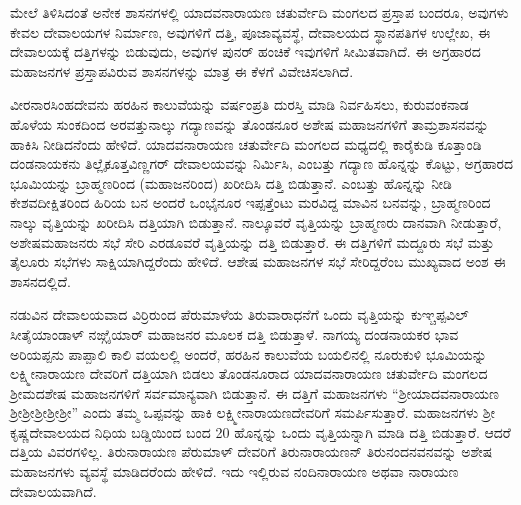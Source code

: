 ಮೇಲೆ ತಿಳಿಸಿದಂತೆ ಅನೇಕ ಶಾಸನಗಳಲ್ಲಿ ಯಾದವನಾರಾಯಣ ಚತುರ್ವೇದಿ ಮಂಗಲದ ಪ್ರಸ್ತಾಪ ಬಂದರೂ, ಅವುಗಳು ಕೇವಲ ದೇವಾಲಯಗಳ ನಿರ್ಮಾಣ, ಅವುಗಳಿಗೆ ದತ್ತಿ, ಪೂಜಾವ್ಯವಸ್ಥೆ, ದೇವಾಲಯದ ಸ್ಥಾನಪತಿಗಳ ಉಲ್ಲೇಖ, ಈ ದೇವಾಲಯಕ್ಕೆ ದತ್ತಿಗಳನ್ನು ಬಿಡುವುದು, ಅವುಗಳ ಪುನರ್​ ಹಂಚಿಕೆ ಇವುಗಳಿಗೆ ಸೀಮಿತವಾಗಿದೆ. ಈ ಅಗ್ರಹಾರದ ಮಹಾಜನಗಳ ಪ್ರಸ್ತಾಪವಿರುವ ಶಾಸನಗಳನ್ನು ಮಾತ್ರ ಈ ಕೆಳಗೆ ವಿವೇಚಿಸಲಾಗಿದೆ.

ವೀರನಾರಸಿಂಹದೇವನು ಹರಹಿನ ಕಾಲುವೆಯನ್ನು ವರ್ಷಂಪ್ರತಿ ದುರಸ್ತಿ ಮಾಡಿ ನಿರ್ವಹಿಸಲು, ಕುರುವಂಕನಾಡ ಹೊಳೆಯ ಸುಂಕದಿಂದ ಅರವತ್ತುನಾಲ್ಕು ಗದ್ಯಾಣವನ್ನು ತೊಂಡನೂರ ಅಶೇಷ ಮಹಾಜನಗಳಿಗೆ ತಾಮ್ರಶಾಸನವನ್ನು ಹಾಕಿಸಿ ನೀಡಿದನೆಂದು ಹೇಳಿದೆ. ಯಾದವನಾರಾಯಣ ಚತುರ್ವೇದಿ ಮಂಗಲದ ಮಧ್ಯದಲ್ಲಿ ಕಾರೈಕುಡಿ ಕೂತ್ತಾಂಡಿ ದಂಡನಾಯಕನು ತಿಲ್ಲೈಕೂತ್ತವಿಣ್ಣಗರ್​ ದೇವಾಲಯವನ್ನು ನಿರ್ಮಿಸಿ, ಎಂಬತ್ತು ಗದ್ಯಾಣ ಹೊನ್ನನ್ನು ಕೊಟ್ಟು, ಅಗ್ರಹಾರದ ಭೂಮಿಯನ್ನು ಬ್ರಾಹ್ಮಣರಿಂದ (ಮಹಾಜನರಿಂದ) ಖರೀದಿಸಿ ದತ್ತಿ ಬಿಡುತ್ತಾನೆ. ಎಂಬತ್ತು ಹೊನ್ನನ್ನು ನೀಡಿ ಕೇಶವದೀಕ್ಷಿತರಿಂದ ಹಿರಿಯ ಬನ ಅಂದರೆ ಒಂಭೈನೂರ ಇಪ್ಪತ್ತೆಂಟು ಮರವಿದ್ದ ಮಾವಿನ ಬನವನ್ನು, ಬ್ರಾಹ್ಮಣರಿಂದ ನಾಲ್ಕು ವೃತ್ತಿಯನ್ನು ಖರೀದಿಸಿ ದತ್ತಿಯಾಗಿ ಬಿಡುತ್ತಾನೆ. ನಾಲ್ಕೂವರೆ ವೃತ್ತಿಯನ್ನು ಬ್ರಾಹ್ಮಣರು ದಾನವಾಗಿ ನೀಡುತ್ತಾರೆ, ಅಶೇಷಮಹಾಜನರು ಸಭೆ ಸೇರಿ ಎರಡೂವರೆ ವೃತ್ತಿಯನ್ನು ದತ್ತಿ ಬಿಡುತ್ತಾರೆ. ಈ ದತ್ತಿಗಳಿಗೆ ಮದ್ದೂರು ಸಭೆ ಮತ್ತು ತೈಲೂರು ಸಭೆಗಳು ಸಾಕ್ಷಿಯಾಗಿದ್ದರೆಂದು ಹೇಳಿದೆ. ಆಶೇಷ ಮಹಾಜನಗಳ ಸಭೆ ಸೇರಿದ್ದರೆಂಬ ಮುಖ್ಯವಾದ ಅಂಶ ಈ ಶಾಸನದಲ್ಲಿದೆ.

ನಡುವಿನ ದೇವಾಲಯವಾದ ವಿರ್ರಿರುಂದ ಪೆರುಮಾಳೆಯ ತಿರುವಾರಾಧನೆಗೆ ಒಂದು ವೃತ್ತಿಯನ್ನು ಕುಞ್ಚಪ್ಪವಿಲ್​ ಸೀತೈಯಾಂಡಾಳ್​ ನಙ್ಗೈಯಾರ್​ ಮಹಾಜನರ ಮೂಲಕ ದತ್ತಿ ಬಿಡುತ್ತಾಳೆ. ನಾಗಯ್ಯ ದಂಡನಾಯಕರ ಭಾವ ಅರಿಯಪ್ಪನು ಪಾಪ್ಪಾಲಿ ಕಾಲಿ ವಯಲಲ್ಲಿ ಅಂದರೆ, ಹರಹಿನ ಕಾಲುವೆಯ ಬಯಲಿನಲ್ಲಿ ನೂರುಕುಳಿ ಭೂಮಿಯನ್ನು ಲಕ್ಷ್ಮೀನಾರಾಯಣ ದೇವರಿಗೆ ದತ್ತಿಯಾಗಿ ಬಿಡಲು ತೊಂಡನೂರಾದ ಯಾದವನಾರಾಯಣ ಚತುರ್ವೇದಿ ಮಂಗಲದ ಶ‍್ರೀಮದಶೇಷ ಮಹಾಜನಗಳಿಗೆ ಸರ್ವಮಾನ್ಯವಾಗಿ ಬಿಡುತ್ತಾನೆ. ಈ ದತ್ತಿಗೆ ಮಹಾಜನಗಳು “ಶ‍್ರೀಯಾದವನಾರಾಯಣ ಶ‍್ರೀಶ‍್ರೀಶ‍್ರೀಶ‍್ರೀಶ‍್ರೀ” ಎಂದು ತಮ್ಮ ಒಪ್ಪವನ್ನು ಹಾಕಿ ಲಕ್ಷ್ಮೀನಾರಾಯಣದೇವರಿಗೆ ಸಮರ್ಪಿಸುತ್ತಾರೆ. ಮಹಾಜನಗಳು ಶ‍್ರೀ ಕೃಷ್ಣದೇವಾಲಯದ ನಿಧಿಯ ಬಡ್ಡಿಯಿಂದ ಬಂದ 20 ಹೊನ್ನನ್ನು ಒಂದು ವೃತ್ತಿಯನ್ನಾಗಿ ಮಾಡಿ ದತ್ತಿ ಬಿಡುತ್ತಾರೆ. ಆದರೆ ದತ್ತಿಯ ವಿವರಗಳಿಲ್ಲ. ತಿರುನಾರಾಯಣ ಪೆರುಮಾಳ್​ ದೇವರಿಗೆ ತಿರುನಾರಾಯಣನ್​ ತಿರುನಂದನವನವನ್ನು ಅಶೇಷ ಮಹಾಜನಗಳು ವ್ಯವಸ್ಥೆ ಮಾಡಿದರೆಂದು ಹೇಳಿದೆ. ಇದು ಇಲ್ಲಿರುವ ನಂದಿನಾರಾಯಣ ಅಥವಾ ನಾರಾಯಣ ದೇವಾಲಯವಾಗಿದೆ.

